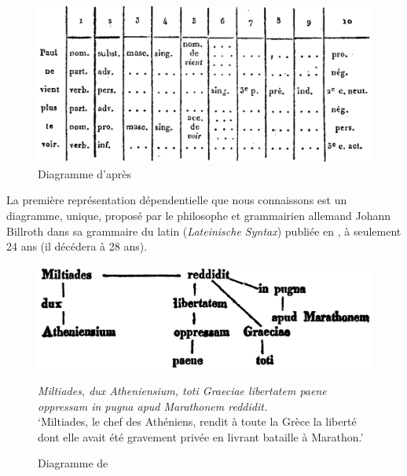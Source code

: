 {    \begin{figure}[H]
    \caption{\label{fig:Gaultier1829}Diagramme d'après \citet{gaultier1817atlas}}
    \includegraphics[width=\textwidth]{figures/Gaultier-conll.png}
    \end{figure}

    
    La première représentation dépendentielle que nous connaissons est un diagramme, unique, proposé par le philosophe et grammairien allemand Johann Billroth dans sa grammaire du latin (\textit{Lateinische Syntax}) publiée en \citeyear{Billroth1832}, à seulement 24 ans (il décédera à 28 ans).

    \begin{figure}[H]
    \caption{\label{fig:Billroth1832}Diagramme de \citet[102]{Billroth1832}}
    \includegraphics[width=.75\textwidth]{figures/Billroth1832.png}\smallskip\\    
    \noindent\parbox{.75\textwidth}{\small\textit{Miltiades, dux Atheniensium, toti Graeciae libertatem paene oppressam in pugna apud Marathonem reddidit.}\\
    ‘Miltiades, le chef des Athéniens, rendit à toute la Grèce la liberté dont elle avait été gravement privée en livrant bataille à Marathon.’}
    \end{figure}

}
